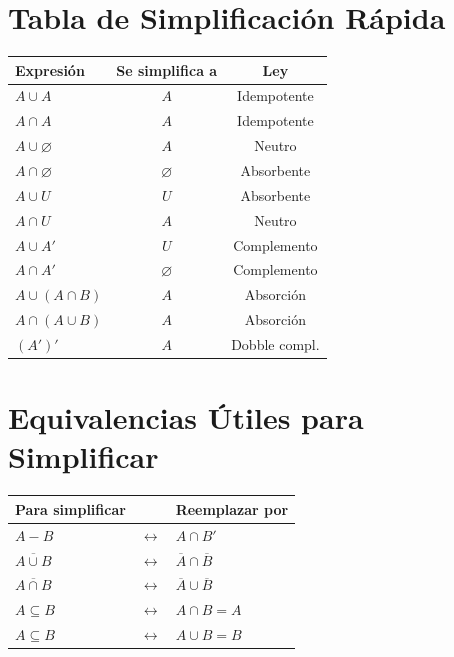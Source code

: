 \documentclass[11pt,a4paper]{article}
\begin{document}
\section{Tabla de Simplificación Rápida}

\begin{center}
\begin{tabular}{lcc}
\toprule
\textbf{Expresión} & \textbf{Se simplifica a} & \textbf{Ley} \\
\midrule
$A \cup A$ & $A$ & Idempotente \\
$A \cap A$ & $A$ & Idempotente \\
$A \cup \varnothing$ & $A$ & Neutro \\
$A \cap \varnothing$ & $\varnothing$ & Absorbente \\
$A \cup U$ & $U$ & Absorbente \\
$A \cap U$ & $A$ & Neutro \\
$A \cup A'$ & $U$ & Complemento \\
$A \cap A'$ & $\varnothing$ & Complemento \\
$A \cup (A \cap B)$ & $A$ & Absorción \\
$A \cap (A \cup B)$ & $A$ & Absorción \\
$(A')'$ & $A$ & Dobble compl. \\
\bottomrule
\end{tabular}
\end{center}

\vspace{1em}

\section{Equivalencias Útiles para Simplificar}

\begin{center}
\begin{tabular}{lcl}
\toprule
\textbf{Para simplificar} & & \textbf{Reemplazar por} \\
\midrule
$A - B$ & $\longleftrightarrow$ & $A \cap B'$ \\
$\overline{A \cup B}$ & $\longleftrightarrow$ & $\overline{A} \cap \overline{B}$ \\
$\overline{A \cap B}$ & $\longleftrightarrow$ & $\overline{A} \cup \overline{B}$ \\
$A \subseteq B$ & $\longleftrightarrow$ & $A \cap B = A$ \\
$A \subseteq B$ & $\longleftrightarrow$ & $A \cup B = B$ \\
\bottomrule
\end{tabular}
\end{center}
\end{document}
